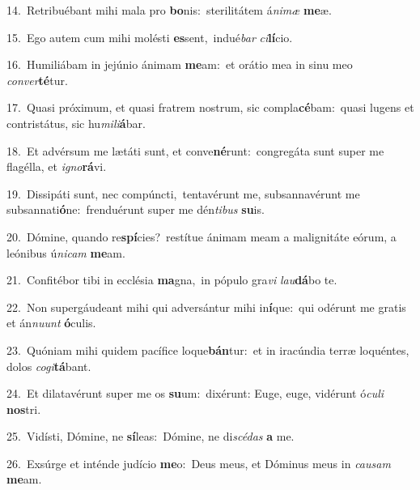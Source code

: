 {\numbfont\textcolor{\numbcolor}{14.}}~Retribuébant mihi mala pro \textbf{bo}\-nis:~\star sterilitátem á\-\textit{ni}\-\textit{mæ} \textbf{me}\-æ.\par
{\numbfont\textcolor{\numbcolor}{15.}}~Ego autem cum mihi molésti \textbf{es}\-sent,~\star indué\textit{bar} \textit{ci}\-\textbf{lí}cio.\par
{\numbfont\textcolor{\numbcolor}{16.}}~Humiliábam in jejúnio ánimam \textbf{me}\-am:~\star et orátio mea in sinu meo \textit{con}\-\textit{ver}\textbf{té}tur.\par
{\numbfont\textcolor{\numbcolor}{17.}}~Quasi próximum, et quasi fratrem nostrum, sic compla\-\textbf{cé}\-bam:~\star quasi lugens et contristátus, sic hu\-\textit{mi}\-\textit{li}\textbf{á}bar.\par
{\numbfont\textcolor{\numbcolor}{18.}}~Et advérsum me lætáti sunt, et conve\-\textbf{né}\-runt:~\star congregáta sunt super me flagélla, et \textit{i}\-\textit{gno}\textbf{rá}vi.\par
{\numbfont\textcolor{\numbcolor}{19.}}~Dissipáti sunt, nec compúncti,~\dagger tentavérunt me, subsannavérunt me subsannati\-\textbf{ó}\-ne:~\star frenduérunt super me dén\-\textit{ti}\-\textit{bus} \textbf{su}\-is.\par
{\numbfont\textcolor{\numbcolor}{20.}}~Dómine, quando re\-\textbf{spí}\-cies?~\star restítue ánimam meam a malignitáte eórum, a leónibus ú\-\textit{ni}\-\textit{cam} \textbf{me}\-am.\par
{\numbfont\textcolor{\numbcolor}{21.}}~Confitébor tibi in ecclésia \textbf{ma}\-gna,~\star in pópulo gra\textit{vi} \textit{lau}\-\textbf{dá}bo te.\par
{\numbfont\textcolor{\numbcolor}{22.}}~Non supergáudeant mihi qui adversántur mihi in\-\textbf{í}\-que:~\star qui odérunt me gratis et án\-\textit{nu}\-\textit{unt} \textbf{ó}\-culis.\par
{\numbfont\textcolor{\numbcolor}{23.}}~Quóniam mihi quidem pacífice loque\-\textbf{bán}\-tur:~\star et in iracúndia terræ loquéntes, dolos \textit{co}\-\textit{gi}\textbf{tá}bant.\par
{\numbfont\textcolor{\numbcolor}{24.}}~Et dilatavérunt super me os \textbf{su}\-um:~\star dixérunt: Euge, euge, vidérunt ó\-\textit{cu}\-\textit{li} \textbf{nos}\-tri.\par
{\numbfont\textcolor{\numbcolor}{25.}}~Vidísti, Dómine, ne \textbf{sí}\-leas:~\star Dómine, ne di\-\textit{scé}\-\textit{das} \textbf{a} me.\par
{\numbfont\textcolor{\numbcolor}{26.}}~Exsúrge et inténde judício \textbf{me}\-o:~\star Deus meus, et Dóminus meus in \textit{cau}\-\textit{sam} \textbf{me}\-am.\par
